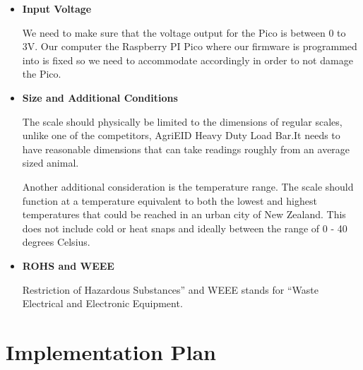\begin{itemize}
\item \textbf{Input Voltage}

We need to make sure that the voltage output for the Pico is between 0 to 3V. Our computer the Raspberry PI Pico where our firmware is programmed into is fixed so we need to accommodate accordingly in order to not damage the Pico.

\item \textbf{Size and Additional Conditions}

The scale should physically be limited to the dimensions of regular scales, unlike one of the competitors, AgriEID Heavy Duty Load Bar.It needs to have reasonable dimensions that can take readings roughly from an average sized animal.

Another additional consideration is the temperature range. The scale should function at a temperature equivalent to both the lowest and highest temperatures that could be reached in an urban city of New Zealand. This does not include cold or heat snaps and ideally between the range of 0 - 40 degrees Celsius. 

\item \textbf{ROHS and WEEE}

Restriction of Hazardous Substances” and WEEE stands for “Waste Electrical and Electronic Equipment.
\end{itemize}



\chapter{Implementation Plan}
